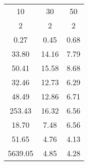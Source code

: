 \begin{tabular}{|c|c|c|}
\toprule
      10 &     30 &    50 \\
       2 &      2 &     2 \\
\midrule
    0.27 &   0.45 &  0.68 \\
   33.80 &  14.16 &  7.79 \\
   50.41 &  15.58 &  8.68 \\
   \cellcolor{\secondcolor}32.46 &  12.73 &  6.29 \\
   48.49 &  12.86 &  6.71 \\
  253.43 &  16.32 &  6.56 \\
   \cellcolor{\firstcolor}18.70 &   7.48 &  6.56 \\
   51.65 &   \cellcolor{\firstcolor}4.76 &  \cellcolor{\firstcolor}4.13 \\
 5639.05 &   \cellcolor{\secondcolor}4.85 &  \cellcolor{\secondcolor}4.28 \\
\bottomrule
\end{tabular}
